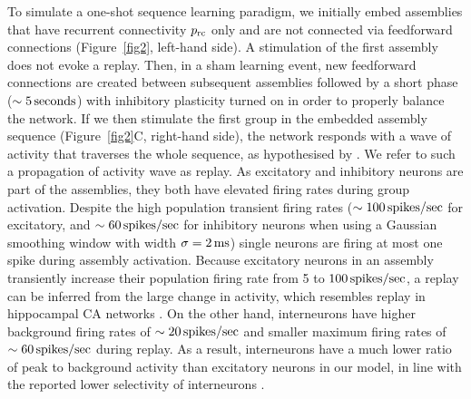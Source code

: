   To simulate a one-shot sequence learning paradigm, we initially embed
  assemblies that have recurrent connectivity $p_{\rm rc}$ only and are not
  connected via feedforward connections (Figure~\ref{fig2}, left-hand side). A
  stimulation of the first assembly does not evoke a replay. Then, in a sham
  learning event, new feedforward connections are created between subsequent
  assemblies followed by a short phase ($\sim 5 \, \rm seconds$) with
  inhibitory plasticity turned on in order to properly balance the network. If
  we then stimulate the first group in the embedded assembly sequence
  (Figure~\ref{fig2}C, right-hand side), the network responds with a wave of
  activity that traverses the whole sequence, as hypothesised by
  \cite{Hebb49}. We refer to such a propagation of activity wave as replay. As
  excitatory and inhibitory neurons are part of the assemblies, they both have
  elevated firing rates during group activation. Despite the high population
  transient firing rates ($\sim 100 \, \rm spikes/sec$ for excitatory, and
  $\sim 60\, \rm spikes/sec$ for inhibitory neurons when using a Gaussian
  smoothing window with width $\sigma = 2 \,\rm ms$) single neurons are firing
  at most one spike during assembly activation. Because excitatory neurons in
  an assembly transiently increase their population firing rate from 5 to $100
  \, \rm spikes/sec$, a replay can be inferred from the large change in
  activity, which resembles replay in hippocampal CA networks \citep{Lee2002}.
  On the other hand, interneurons have higher background firing rates of $\sim
  20 \, \rm spikes/sec$ and smaller maximum firing rates of $\sim 60 \, \rm
  spikes/sec$ during replay. As a result, interneurons have a much lower ratio
  of peak to background activity than excitatory neurons in our model, in line
  with the reported lower selectivity of interneurons \citep{Wilson1993}.


